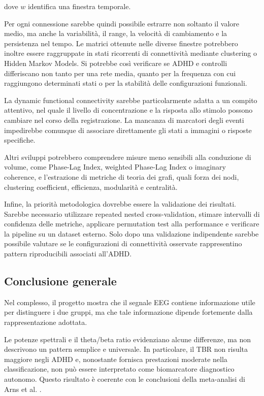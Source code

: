 dove $w$ identifica una finestra temporale.

Per ogni connessione sarebbe quindi possibile estrarre non soltanto
il valore medio, ma anche la variabilità, il range, la velocità di
cambiamento e la persistenza nel tempo. Le matrici ottenute nelle
diverse finestre potrebbero inoltre essere raggruppate in stati
ricorrenti di connettività mediante clustering o Hidden Markov
Models. Si potrebbe così verificare se ADHD e controlli differiscano
non tanto per una rete media, quanto per la frequenza con cui
raggiungono determinati stati o per la stabilità delle configurazioni
funzionali.

La dynamic functional connectivity sarebbe particolarmente adatta a
un compito attentivo, nel quale il livello di concentrazione e la
risposta allo stimolo possono cambiare nel corso della registrazione.
La mancanza di marcatori degli eventi impedirebbe comunque di
associare direttamente gli stati a immagini o risposte specifiche.

Altri sviluppi potrebbero comprendere misure meno sensibili alla
conduzione di volume, come Phase-Lag Index, weighted Phase-Lag Index
o imaginary coherence, e l'estrazione di metriche di teoria dei
grafi, quali forza dei nodi, clustering coefficient, efficienza,
modularità e centralità.

Infine, la priorità metodologica dovrebbe essere la validazione dei
risultati. Sarebbe necessario utilizzare repeated nested
cross-validation, stimare intervalli di confidenza delle metriche,
applicare permutation test alla performance e verificare la pipeline
su un dataset esterno. Solo dopo una validazione indipendente sarebbe
possibile valutare se le configurazioni di connettività osservate
rappresentino pattern riproducibili associati all'ADHD.


\subsection{Conclusione generale}

Nel complesso, il progetto mostra che il segnale EEG contiene
informazione utile per distinguere i due gruppi, ma che tale
informazione dipende fortemente dalla rappresentazione adottata.

Le potenze spettrali e il theta/beta ratio evidenziano alcune
differenze, ma non descrivono un pattern semplice e universale. In
particolare, il TBR non risulta maggiore negli ADHD e, nonostante
fornisca prestazioni moderate nella classificazione, non può essere
interpretato come biomarcatore diagnostico autonomo. Questo risultato
è coerente con le conclusioni della meta-analisi di Arns et al.
\cite{Arns2013}.

